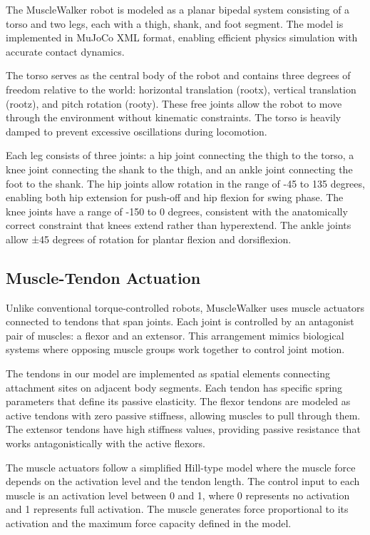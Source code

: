 \documentclass[conference]{IEEEtran}
\begin{document}
The MuscleWalker robot is modeled as a planar bipedal system consisting of a torso and two legs, each with a thigh, shank, and foot segment. The model is implemented in MuJoCo XML format, enabling efficient physics simulation with accurate contact dynamics.

The torso serves as the central body of the robot and contains three degrees of freedom relative to the world: horizontal translation (rootx), vertical translation (rootz), and pitch rotation (rooty). These free joints allow the robot to move through the environment without kinematic constraints. The torso is heavily damped to prevent excessive oscillations during locomotion.

Each leg consists of three joints: a hip joint connecting the thigh to the torso, a knee joint connecting the shank to the thigh, and an ankle joint connecting the foot to the shank. The hip joints allow rotation in the range of -45 to 135 degrees, enabling both hip extension for push-off and hip flexion for swing phase. The knee joints have a range of -150 to 0 degrees, consistent with the anatomically correct constraint that knees extend rather than hyperextend. The ankle joints allow ±45 degrees of rotation for plantar flexion and dorsiflexion.

\subsection{Muscle-Tendon Actuation}

Unlike conventional torque-controlled robots, MuscleWalker uses muscle actuators connected to tendons that span joints. Each joint is controlled by an antagonist pair of muscles: a flexor and an extensor. This arrangement mimics biological systems where opposing muscle groups work together to control joint motion.

The tendons in our model are implemented as spatial elements connecting attachment sites on adjacent body segments. Each tendon has specific spring parameters that define its passive elasticity. The flexor tendons are modeled as active tendons with zero passive stiffness, allowing muscles to pull through them. The extensor tendons have high stiffness values, providing passive resistance that works antagonistically with the active flexors.

The muscle actuators follow a simplified Hill-type model where the muscle force depends on the activation level and the tendon length. The control input to each muscle is an activation level between 0 and 1, where 0 represents no activation and 1 represents full activation. The muscle generates force proportional to its activation and the maximum force capacity defined in the model.
\end{document}
